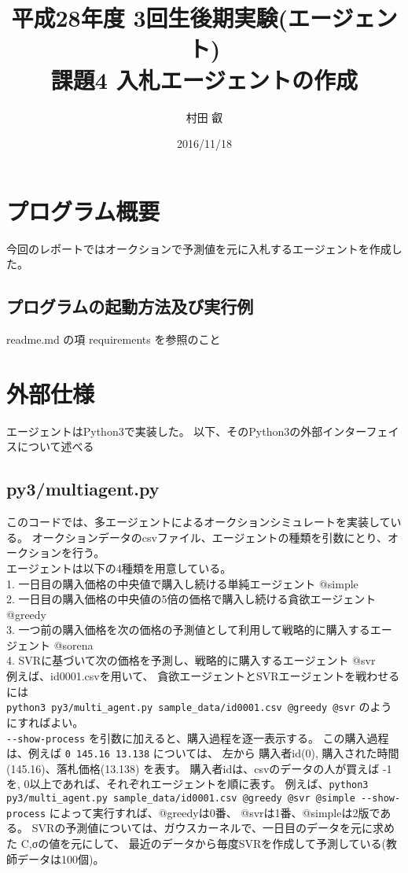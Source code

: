 \documentclass[]{jsarticle}
\begin{document}
\title{平成28年度 3回生後期実験(エージェント) \\ 課題4 入札エージェントの作成 }
\author{村田 叡}
\date{ 2016/11/18 }
\maketitle

\section{プログラム概要}
今回のレポートではオークションで予測値を元に入札するエージェントを作成した。

\subsection{プログラムの起動方法及び実行例}
readme.md  の項 requirements を参照のこと

\section{外部仕様}
エージェントはPython3で実装した。
以下、そのPython3の外部インターフェイスについて述べる

\subsection{py3/multiagent.py}
このコードでは、多エージェントによるオークションシミュレートを実装している。
オークションデータのcsvファイル、エージェントの種類を引数にとり、オークションを行う。 \\
エージェントは以下の4種類を用意している。 \\
1. 一日目の購入価格の中央値で購入し続ける単純エージェント @simple \\
2. 一日目の購入価格の中央値の5倍の価格で購入し続ける貪欲エージェント @greedy \\
3. 一つ前の購入価格を次の価格の予測値として利用して戦略的に購入するエージェント @sorena \\
4. SVRに基づいて次の価格を予測し、戦略的に購入するエージェント @svr \\
例えば、id0001.csvを用いて、 貪欲エージェントとSVRエージェントを戦わせるには \\
\verb|python3 py3/multi_agent.py sample_data/id0001.csv @greedy @svr|
のようにすればよい。 \\
\verb|--show-process| を引数に加えると、購入過程を逐一表示する。
この購入過程は、例えば \verb|0 145.16 13.138| については、
左から 購入者id(0), 購入された時間(145.16)、落札価格(13.138) を表す。
購入者idは、csvのデータの人が買えば -1を,
0以上であれば、それぞれエージェントを順に表す。
例えば、\verb|python3 py3/multi_agent.py sample_data/id0001.csv @greedy @svr @simple --show-process|
 によって実行すれば、@greedyは0番、 @svrは1番、@simpleは2版である。
SVRの予測値については、ガウスカーネルで、一日目のデータを元に求めた C,σの値を元にして、
最近のデータから毎度SVRを作成して予測している(教師データは100個)。
\end{document}
